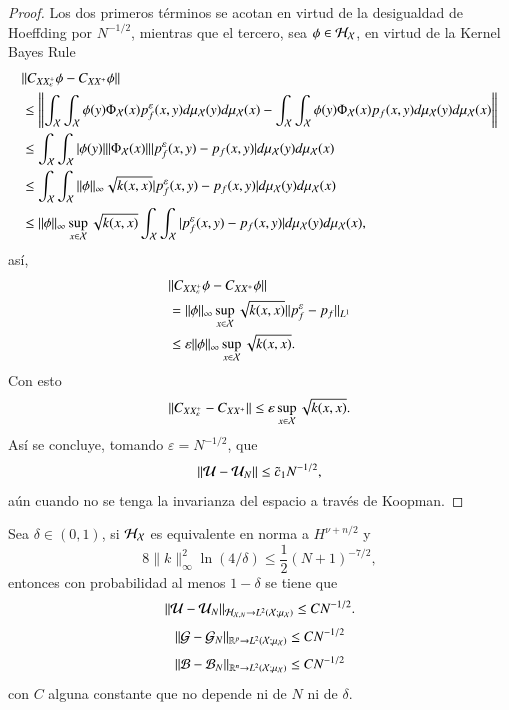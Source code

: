 \begin{proof}
    Los dos primeros términos se acotan en virtud de la desigualdad de Hoeffding por $N^{-1/2}$, mientras que el tercero, sea $\phi \in \mathcal{H}_{\mathcal{X}}$, en virtud de la Kernel Bayes Rule
\[
\begin{aligned}
    & \| C_{XX_\varepsilon^+} \phi - C_{XX^+} \phi \|\\
    & \leq \left \| 
    \int_{\mathcal{X}} \int_{\mathcal{X}} \phi(y) \Phi_{\mathcal{X}} (x) p^\varepsilon_f (x, y) d \mu_{\mathcal{X}} (y) d \mu_{\mathcal{X}} (x) -  \int_{\mathcal{X}} \int_{\mathcal{X}} \phi(y) \Phi_{\mathcal{X}} (x) p_f (x, y) d \mu_{\mathcal{X}} (y) d \mu_{\mathcal{X}} (x) \right \| \\
    & \leq  
    \int_{\mathcal{X}} \int_{\mathcal{X}} | \phi(y)| \| \Phi_{\mathcal{X}} (x) \| |p^\varepsilon_f (x, y) - p_f (x, y)|  d \mu_{\mathcal{X}} (y) d \mu_{\mathcal{X}} (x) \\
    & \leq \int_{\mathcal{X}} \int_{\mathcal{X}} \| \phi \|_\infty \sqrt{k(x,x)} |p^\varepsilon_f (x, y) - p_f (x, y)|  d \mu_{\mathcal{X}} (y) d \mu_{\mathcal{X}} (x) \\
    & \leq \| \phi \|_\infty \sup_{x \in \mathcal{X}}  \sqrt{k(x,x)}  \int_{\mathcal{X}} \int_{\mathcal{X}} |p^\varepsilon_f (x, y) - p_f (x, y)| d \mu_{\mathcal{X}} (y) d \mu_{\mathcal{X}} (x),
\end{aligned}
\]
así,
\[
\begin{aligned}
    & \| C_{XX_\varepsilon^+} \phi - C_{XX^+} \phi \|\\
    & =  \| \phi \|_\infty \sup_{x \in \mathcal{X}}  \sqrt{k(x,x)} \| p_f^\varepsilon - p_f \|_{L^1} \\
    & \leq \varepsilon \| \phi \|_\infty \sup_{x \in \mathcal{X}} \sqrt{k(x,x)}.
\end{aligned}
\]
Con esto
\[
\| C_{XX_\varepsilon^+} - C_{XX^+}  \| \leq \varepsilon \sup_{x \in \mathcal{X}} \sqrt{k(x,x)}.
\]
Así se concluye, tomando $\varepsilon = N^{-1/2}$, que
\[
\| \mathcal{U} - \mathcal{U}_N \| \leq \Tilde{c}_1 N^{-1/2},
\]
aún cuando no se tenga la invarianza del espacio a través de Koopman.
\end{proof}

\begin{teo}
    Sea $\delta \in (0, 1)$, si $\mathcal{H}_{\mathcal{X}}$ es equivalente en norma a $H^{\nu + n/2}$ y 
    \[
    8\|k\|^2_\infty \ln(4/\delta) \leq \frac{1}{2} (N+1)^{-7/2},
    \]
    entonces con probabilidad al menos $1-\delta$ se tiene que
     \begin{equation*}
        \| \mathcal{U} - \mathcal{U}_N \|_{\mathcal{H}_{\mathcal{X}, N} \to L^2(\mathcal{X}; \mu_{\mathcal{X}})} \leq C N^{-1/2}.
    \end{equation*}
    \begin{equation*}
    \| \mathcal{G} - \mathcal{G}_N \|_{\mathbb{R}^p \to L^2(\mathcal{X}; \mu_{\mathcal{X}})} \leq C N^{-1/2}
    \end{equation*}
    \begin{equation*}
    \| \mathcal{B} - \mathcal{B}_N \|_{\mathbb{R}^n \to L^2(\mathcal{X}; \mu_{\mathcal{X}})} \leq C N^{-1/2}
    \end{equation*}
    con $C$ alguna constante que no depende ni de $N$ ni de $\delta$.
    \label{teo:error_koop_sqrt_N_def}
\end{teo}

